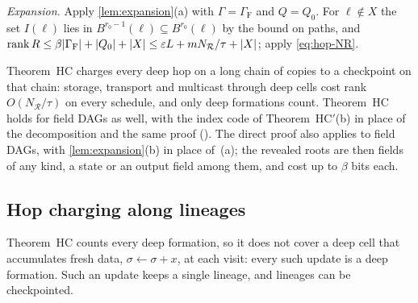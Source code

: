 \begin{remark}
\emph{Expansion.} Apply \cref{lem:expansion}(a) with $\Gamma=\Gamma_{\mathrm F}$ and $Q=Q_0$. For $\ell\notin X$ the set
$I(\ell)$ lies in $B^{r_0-1}(\ell)\subseteq B^{r_0}(\ell)$ by the bound on paths, and
$\operatorname{rank} R\le\beta\lvert \Gamma_{\mathrm F} \rvert+\lvert Q_0 \rvert+\lvert X \rvert\le\varepsilon L+mN_{\mathcal R}/\tau+\lvert X \rvert$; apply
\eqref{eq:hop-NR}.
\end{remark}

Theorem~HC charges every deep hop on a long chain of copies to a checkpoint on that chain: storage, transport and
multicast through deep cells cost rank $O(N_{\mathcal R}/\tau)$ on every schedule, and only deep formations count.
Theorem~HC holds for field DAGs as well, with the index code of Theorem~HC$'$(b) in place of the decomposition and the
same proof (). The direct proof also applies to field DAGs, with
\cref{lem:expansion}(b) in place of~(a); the revealed roots are then fields of any kind, a state or an output field among
them, and cost up to $\beta$ bits each.

\subsection{Hop charging along lineages}\label{sec:hop-HCprime}

Theorem~HC counts every deep formation, so it does not cover a deep cell that accumulates fresh data,
$\sigma\leftarrow\sigma+x$, at each visit: every such update is a deep formation. Such an update keeps a single lineage,
and lineages can be checkpointed.

